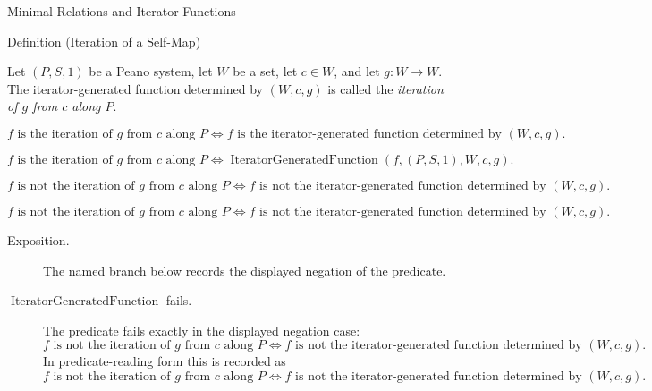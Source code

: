 \begin{topicbox}{Minimal Relations and Iterator Functions}
\begin{definitionbox}{Definition (Iteration of a Self-Map)}
\begin{definition}
\label{def:iteration-of-a-self-map}
Let $(P,S,1)$ be a Peano system, let $W$ be a set, let $c\in W$, and let
$g:W\to W$. The iterator-generated function determined by $(W,c,g)$ is called
the \emph{iteration of $g$ from $c$ along $P$}.
\end{definition}
\end{definitionbox}

\begin{remark*}
\[
f \text{ is the iteration of } g \text{ from } c \text{ along } P
\Longleftrightarrow
f \text{ is the iterator-generated function determined by } (W,c,g).
\]
\end{remark*}

\begin{remark*}
\[
f \text{ is the iteration of } g \text{ from } c \text{ along } P
\Longleftrightarrow
\operatorname{IteratorGeneratedFunction}(f,(P,S,1),W,c,g).
\]
\end{remark*}

\begin{remark*}
\[
f \text{ is not the iteration of } g \text{ from } c \text{ along } P
\Longleftrightarrow
f \text{ is not the iterator-generated function determined by } (W,c,g).
\]
\end{remark*}

\begin{remark*}
\[
f \text{ is not the iteration of } g \text{ from } c \text{ along } P
\Longleftrightarrow
f \text{ is not the iterator-generated function determined by } (W,c,g).
\]
\end{remark*}

\begin{remark*}
\begin{description}
  \item[Exposition.] The named branch below records the displayed negation of the predicate.
  \item[\(\operatorname{IteratorGeneratedFunction}\) fails.] The predicate fails exactly in the displayed negation case:
  \[
  f \text{ is not the iteration of } g \text{ from } c \text{ along } P
  \Longleftrightarrow
  f \text{ is not the iterator-generated function determined by } (W,c,g).
  \]
  In predicate-reading form this is recorded as
  \[
  f \text{ is not the iteration of } g \text{ from } c \text{ along } P
  \Longleftrightarrow
  f \text{ is not the iterator-generated function determined by } (W,c,g).
  \]
\end{description}
\end{remark*}


\end{topicbox}
